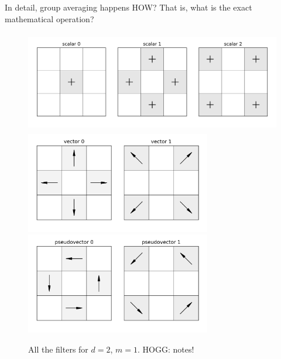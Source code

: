 \documentclass{article}
\theoremstyle{plain}
\begin{document}
In detail, group averaging happens HOW? That is, what is the exact mathematical operation?

\begin{figure}[tp]
\includegraphics[height=1.75in]{notebooks/scalar_2_3_0.png}\\
\includegraphics[height=1.75in]{notebooks/vector_2_3_1.png}\\
\includegraphics[height=1.75in]{notebooks/pseudovector_2_3_1.png}
\caption{All the filters for $d=2$, $m=1$. HOGG: notes!}
\end{figure}
\end{document}
